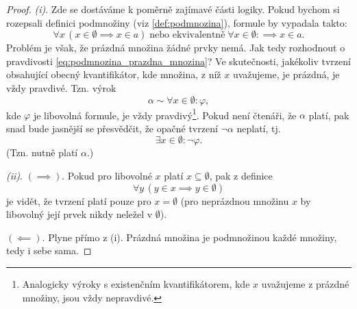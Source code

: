 \begin{proof}
    \textit{(i)}. Zde se dostáváme k poměrně zajímavé části logiky. Pokud bychom si rozepsali definici podmnožiny (viz \ref{def:podmnozina}), formule by vypadala takto:
    \begin{equation}\label{eq:podmnozina_prazdna_mnozina}
        \forall x\,(x\in\emptyset \implies x\in a)\;\text{nebo ekvivalentně}\;\forall x\in\emptyset:\implies x\in a.
    \end{equation}
    Problém je však, že prázdná množina žádné prvky nemá. Jak tedy rozhodnout o pravdivosti \eqref{eq:podmnozina_prazdna_mnozina}? Ve skutečnosti, jakékoliv tvrzení obsahující obecný kvantifikátor, kde množina, z níž $x$ uvažujeme, je prázdná, je vždy pravdivé. Tzn. výrok
    \begin{equation*}
        \alpha\sim\forall x\in\emptyset: \varphi,
    \end{equation*}
    kde $\varphi$ je libovolná formule, je vždy pravdivý\footnote{Analogicky výroky s existenčním kvantifikátorem, kde $x$ uvažujeme z prázdné množiny, jsou vždy nepravdivé.}. Pokud není čtenáři, že $\alpha$ platí, pak snad bude jasnější se přesvědčit, že opačné tvrzení $\neg\alpha$ neplatí, tj.
    \begin{equation*}
        \exists x\in\emptyset: \neg\varphi.
    \end{equation*}
    (Tzn. nutně platí $\alpha$.)\par
    \textit{(ii)}. \textit{$(\implies)$}. Pokud pro libovolné $x$ platí $x\subseteq\emptyset$, pak z definice
    \begin{equation*}
        \forall y\,(y\in x \implies y\in\emptyset)
    \end{equation*}
    je vidět, že tvrzení platí pouze pro $x=\emptyset$ (pro neprázdnou množinu $x$ by libovolný její prvek nikdy neležel v $\emptyset$).\par
    \textit{$(\impliedby)$}. Plyne přímo z (i). Prázdná množina je podmnožinou každé množiny, tedy i sebe sama.
\end{proof}

